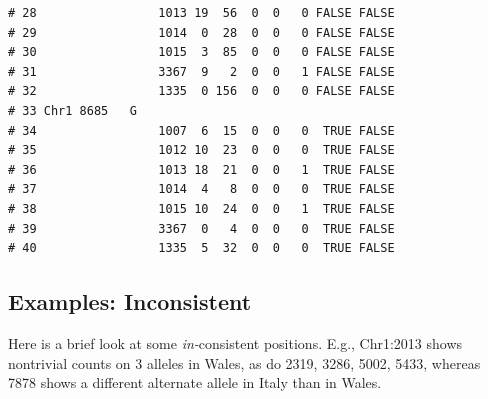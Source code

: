 \documentclass{article}\usepackage[]{graphicx}\usepackage[]{color}
\makeatletter
\newenvironment{kframe}{%
 \def\at@end@of@kframe{}%
 \ifinner\ifhmode%
  \def\at@end@of@kframe{\end{minipage}}%
  \begin{minipage}{\columnwidth}%
 \fi\fi%
 \def\FrameCommand##1{\hskip\@totalleftmargin \hskip-\fboxsep
 \colorbox{shadecolor}{##1}\hskip-\fboxsep
     \hskip-\linewidth \hskip-\@totalleftmargin \hskip\columnwidth}%
 \MakeFramed {\advance\hsize-\width
   \@totalleftmargin\z@ \linewidth\hsize
   \@setminipage}}%
 {\par\unskip\endMakeFramed%
 \at@end@of@kframe}
\newenvironment{knitrout}{}{} %
\makeatother
\begin{document}
\begin{knitrout}
\begin{kframe}
\begin{verbatim}
# 28                 1013 19  56  0  0   0 FALSE FALSE        
# 29                 1014  0  28  0  0   0 FALSE FALSE        
# 30                 1015  3  85  0  0   0 FALSE FALSE        
# 31                 3367  9   2  0  0   1 FALSE FALSE        
# 32                 1335  0 156  0  0   0 FALSE FALSE        
# 33 Chr1 8685   G                                            
# 34                 1007  6  15  0  0   0  TRUE FALSE        
# 35                 1012 10  23  0  0   0  TRUE FALSE        
# 36                 1013 18  21  0  0   1  TRUE FALSE        
# 37                 1014  4   8  0  0   0  TRUE FALSE        
# 38                 1015 10  24  0  0   1  TRUE FALSE        
# 39                 3367  0   4  0  0   0  TRUE FALSE        
# 40                 1335  5  32  0  0   0  TRUE FALSE
\end{verbatim}
\end{kframe}
\end{knitrout}

\subsection{Examples: Inconsistent}
Here is a brief look at some \emph{in-}consistent positions.  E.g., Chr1:2013 shows nontrivial counts on 3 alleles in Wales, as do 2319, 3286, 5002, 5433, whereas 7878 shows a different alternate allele in Italy than in Wales.
\end{document}

